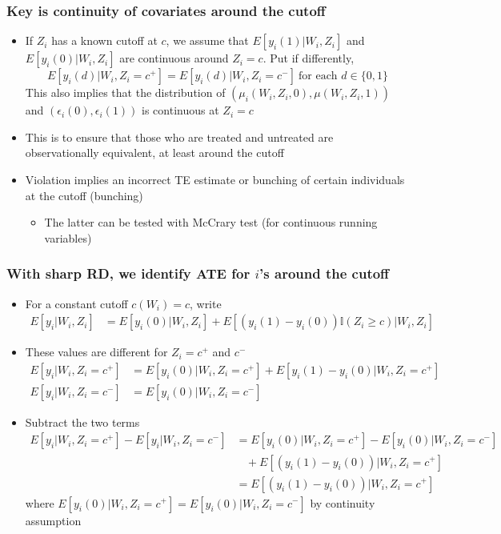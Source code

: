 \documentclass[aspectratio=169]{beamer}
\begin{document}
\begin{frame}
\frametitle{Key is continuity of covariates around the cutoff}
\begin{itemize}
\item  If $Z_i$ has a known cutoff at $c$, we assume that $E[y_i(1)|W_i, Z_i]$ and $E[y_i(0)|W_i, Z_i]$ are continuous around $Z_i=c$. Put if differently, 
\[
E[y_i(d)|W_i, Z_i=c^+]=E[y_i(d)|W_i, Z_i=c^-] \  \text{for each } d\in\{0,1\}
\]
This also implies that the distribution of $(\mu_i(W_i, Z_i,0),\mu(W_i, Z_i,1))$ and $(\epsilon_i(0),\epsilon_i(1))$ is continuous at $Z_i=c$
\item This is to ensure that those who are treated and untreated are observationally equivalent, at least around the cutoff
\item Violation implies an incorrect TE estimate or bunching of certain individuals at the cutoff (bunching)
\begin{itemize}
\item The latter can be tested with McCrary test (for continuous running variables)
\end{itemize}
\end{itemize}
\end{frame}

\begin{frame}
\frametitle{With sharp RD, we identify ATE for $i$'s around the cutoff}
\begin{itemize}
\item For a constant cutoff $c(W_i)=c$, write 
\begin{align*}
E[y_i|W_i, Z_i]&=E[y_i(0)|W_i, Z_i]+E[(y_i(1)-y_i(0))\mathbb{I}(Z_i\geq c)|W_i, Z_i]
\end{align*}
\item These values are different for $Z_i=c^+$ and $c^-$
\begin{align*}
E[y_i|W_i, Z_i=c^+]&=E[y_i(0)|W_i, Z_i=c^+]+E[y_i(1)-y_i(0)|W_i, Z_i=c^+]\\
E[y_i|W_i, Z_i=c^-]&=E[y_i(0)|W_i, Z_i=c^-]
\end{align*}
\item Subtract the two terms 
\begin{align*}
E[y_i|W_i, Z_i=c^+] - E[y_i|W_i, Z_i=c^-]&=E[y_i(0)|W_i, Z_i=c^+]-E[y_i(0)|W_i, Z_i=c^-]\\
 &\ \ \ \ +E[(y_i(1)-y_i(0))|W_i, Z_i=c^+]\\
 &=E[(y_i(1)-y_i(0))|W_i, Z_i=c^+]
\end{align*}
where $E[y_i(0)|W_i, Z_i=c^+]=E[y_i(0)|W_i, Z_i=c^-]$ by continuity assumption
\end{itemize}
\end{frame}
\end{document}
